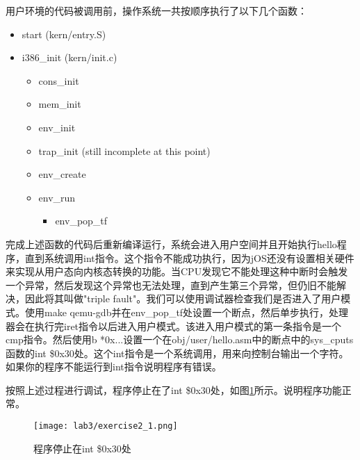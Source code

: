 \par 用户环境的代码被调用前，操作系统一共按顺序执行了以下几个函数：
\begin{itemize}
    \item start (kern/entry.S)
    \item i386\_init (kern/init.c)
        \begin{itemize}
            \item cons\_init
            \item mem\_init
            \item env\_init
            \item trap\_init (still incomplete at this point)
            \item env\_create
            \item env\_run
                \begin{itemize}
                    \item env\_pop\_tf
                \end{itemize}
        \end{itemize}
\end{itemize}
\par 完成上述函数的代码后重新编译运行，系统会进入用户空间并且开始执行hello程序，直到系统调用int指令。这个指令不能成功执行，因为jOS还没有设置相关硬件来实现从用户态向内核态转换的功能。当CPU发现它不能处理这种中断时会触发一个异常，然后发现这个异常也无法处理，直到产生第三个异常，但仍旧不能解决，因此将其叫做"triple fault"。我们可以使用调试器检查我们是否进入了用户模式。使用make qemu-gdb并在env\_pop\_tf处设置一个断点，然后单步执行，处理器会在执行完iret指令以后进入用户模式。该进入用户模式的第一条指令是一个cmp指令。然后使用b *0x...设置一个在obj/user/hello.asm中的断点中的sys\_cputs函数的int \$0x30处。这个int指令是一个系统调用，用来向控制台输出一个字符。如果你的程序不能运行到int指令说明程序有错误。
\par 按照上述过程进行调试，程序停止在了int \$0x30处，如图\ref{fig:lab3/exercise2_1}所示。说明程序功能正常。
\begin{figure}[htb]
    \centering
    \texttt{[image: lab3/exercise2\_1.png]}
    \caption{程序停止在int \$0x30处}
    \label{fig:lab3/exercise2_1}
\end{figure}

